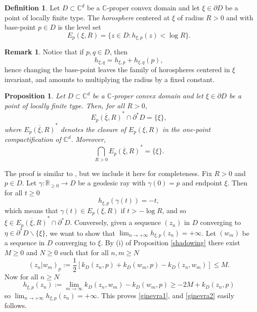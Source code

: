 \documentclass[11pt, reqno]{amsart}
\numberwithin{equation}{section}
\newtheorem{proposition}[theorem]{Proposition}
\theoremstyle{definition}
\newtheorem{remark}[theorem]{Remark}
\newtheorem{definition}[theorem]{Definition}
\newcommand{\C}{\mathbb{C}}
\newcommand{\R}{\mathbb{R}}
\begin{document}
{		
		
		
		
\endproof
		
\begin{definition}
Let $D\subset\C^d$ be a $\C$-proper convex domain and let $\xi\in\partial D$ be a point of locally finite type. The {\sl horosphere} centered at $\xi$ of radius $R>0$ and with base-point $p\in D$ is the level set
$$E_p(\xi,R)=\{z\in D\colon h_{\xi,p}(z)<\log R\}.$$
\end{definition}
	\begin{remark}\label{intersezchiusura} Notice that if $p,q\in D$, then 
			\begin{equation*}\label{cambiaorofunzione}
				h_{\xi,q}=h_{\xi,p}+h_{\xi,q}(p),
			\end{equation*} hence changing the base-point leaves the family of horospheres centered in $\xi$ invariant, and amounts to multiplying the radius  by a fixed constant. 
		\end{remark}
		
\begin{proposition}	
Let $D\subset\C^d$ be a $\C$-proper convex domain and let $\xi\in\partial D$ be a point of locally finite type.
Then, for all $R>0$,
\begin{equation}\label{ginevra1} \overline{E_p(\xi,R)}^*\cap\partial^* D=\{\xi\},
\end{equation}	where $\overline{E_p(\xi, R)}^*$ denotes the closure of $E_p(\xi, R)$ in the one-point compactification of $\C^d$.
Moreover,
\begin{equation}\label{ginevra2} \bigcap_{R>0}\overline{E_p(\xi,R)}^*=\{\xi\}.
\end{equation}
	\end{proposition}
\proof
The proof is similar to \cite[Proposition 6.5]{AFGG}, but we include it here for completeness.
 Fix $R>0$ and $p\in D$. Let $\gamma\colon\R_{\geq0}\to D$ be a geodesic ray with $\gamma(0)=p$ and endpoint $\xi$. Then for all $t\geq0$
$$h_{\xi,p}(\gamma(t))=-t,$$
which means that $\gamma(t)\in E_p(\xi,R)$ if $t>-\log R$, and so $\xi\in \overline{E_p(\xi,R)}^*\cap\partial^* D$.
Conversely, given a   sequence  $(z_n)$ in $D$ converging to $\eta\in\partial^* D\backslash\{\xi\}$, we want to show that $\lim_{n\to+\infty}h_{\xi,p}(z_n)=+\infty$. Let $(w_m)$ be a sequence in $D$ converging to $\xi$. By (i) of Proposition \ref{shadowing} there exist $M\geq 0$ and $N\geq 0$ such that for all $n,m\geq N$
$$(z_n|w_m)_p:=\frac{1}{2}[k_D(z_n,p)+k_D(w_m,p)-k_D(z_n,w_m)]\leq M.$$
Now for all $n\geq N$
$$h_{\xi,p}(z_n):=\lim_{m\to\infty}k_D(z_n,w_m)-k_D(w_m,p)\geq-2M+k_D(z_n,p)$$
so $\lim_{n\to+\infty}h_{\xi,p}(z_n)=+\infty$. This proves \eqref{ginevra1}, and  \eqref{ginevra2} easily follows.
\endproof
		
}
\end{document}

